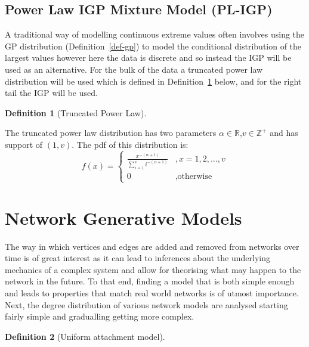 \documentclass[
  10pt,
  a4paper,
]{scrreprt}
\theoremstyle{definition}
\newtheorem{definition}{Definition}[section]
\theoremstyle{remark}
\begin{document}
{\hypertarget{power-law-igp-mixture-model-pl-igp}{%
\subsection{Power Law IGP Mixture Model
(PL-IGP)}\label{power-law-igp-mixture-model-pl-igp}}

A traditional way of modelling continuous extreme values often involves
using the GP distribution (Definition~\ref{def-gp}) to model the
conditional distribution of the largest values however here the data is
discrete and so instead the IGP will be used as an alternative. For the
bulk of the data a truncated power law distribution will be used which
is defined in Definition~\ref{def-tpl} below, and for the right tail the
IGP will be used.

\begin{definition}[Truncated Power
Law]\protect\hypertarget{def-tpl}{}\label{def-tpl}

The truncated power law distribution has two parameters
\(\alpha \in \mathbb R\),\(v \in \mathbb Z^+\) and has support of
\((1,v)\). The pdf of this distribution is: \[
f(x) = \begin{cases}
\frac{x^{-(\alpha+1)}}{\sum_{i=1}^v i^{-(\alpha+1)}}&,x=1,2,\ldots,v\\
0&,\text{otherwise}
\end{cases}
\]

\end{definition}

\hypertarget{network-generative-models}{%
\section{Network Generative Models}\label{network-generative-models}}

The way in which vertices and edges are added and removed from networks
over time is of great interest as it can lead to inferences about the
underlying mechanics of a complex system and allow for theorising what
may happen to the network in the future. To that end, finding a model
that is both simple enough and leads to properties that match real world
networks is of utmost importance. Next, the degree distribution of
various network models are analysed starting fairly simple and
gradualling getting more complex.

\begin{definition}[Uniform attachment
model]\protect\hypertarget{def-uniform}{}\label{def-uniform}


\end{definition}}
\end{document}
